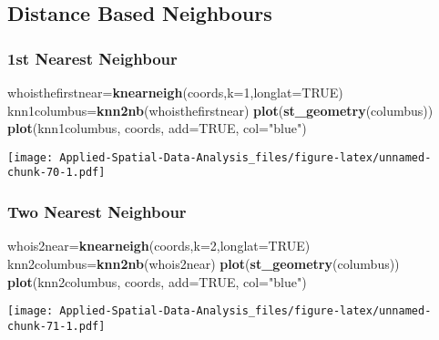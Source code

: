 \documentclass[
]{book}
\newenvironment{Shaded}{\begin{snugshade}}{\end{snugshade}}
\newcommand{\DataTypeTok}[1]{\textcolor[rgb]{0.13,0.29,0.53}{#1}}
\newcommand{\DecValTok}[1]{\textcolor[rgb]{0.00,0.00,0.81}{#1}}
\newcommand{\KeywordTok}[1]{\textcolor[rgb]{0.13,0.29,0.53}{\textbf{#1}}}
\newcommand{\NormalTok}[1]{#1}
\newcommand{\OtherTok}[1]{\textcolor[rgb]{0.56,0.35,0.01}{#1}}
\newcommand{\StringTok}[1]{\textcolor[rgb]{0.31,0.60,0.02}{#1}}
\begin{document}
\hypertarget{distance-based-neighbours}{%
\subsection{Distance Based Neighbours}\label{distance-based-neighbours}}

\hypertarget{st-nearest-neighbour}{%
\subsubsection{1st Nearest Neighbour}\label{st-nearest-neighbour}}

\begin{Shaded}
\begin{Highlighting}[]
\NormalTok{whoisthefirstnear=}\KeywordTok{knearneigh}\NormalTok{(coords,}\DataTypeTok{k=}\DecValTok{1}\NormalTok{,}\DataTypeTok{longlat=}\OtherTok{TRUE}\NormalTok{)}
\NormalTok{knn1columbus=}\KeywordTok{knn2nb}\NormalTok{(whoisthefirstnear)}
\KeywordTok{plot}\NormalTok{(}\KeywordTok{st_geometry}\NormalTok{(columbus))}
\KeywordTok{plot}\NormalTok{(knn1columbus, coords, }\DataTypeTok{add=}\OtherTok{TRUE}\NormalTok{, }\DataTypeTok{col=}\StringTok{"blue"}\NormalTok{)}
\end{Highlighting}
\end{Shaded}

\texttt{[image: Applied-Spatial-Data-Analysis\_files/figure-latex/unnamed-chunk-70-1.pdf]}

\hypertarget{two-nearest-neighbour}{%
\subsubsection{Two Nearest Neighbour}\label{two-nearest-neighbour}}

\begin{Shaded}
\begin{Highlighting}[]
\NormalTok{whois2near=}\KeywordTok{knearneigh}\NormalTok{(coords,}\DataTypeTok{k=}\DecValTok{2}\NormalTok{,}\DataTypeTok{longlat=}\OtherTok{TRUE}\NormalTok{)}
\NormalTok{knn2columbus=}\KeywordTok{knn2nb}\NormalTok{(whois2near)}
\KeywordTok{plot}\NormalTok{(}\KeywordTok{st_geometry}\NormalTok{(columbus))}
\KeywordTok{plot}\NormalTok{(knn2columbus, coords, }\DataTypeTok{add=}\OtherTok{TRUE}\NormalTok{, }\DataTypeTok{col=}\StringTok{"blue"}\NormalTok{)}
\end{Highlighting}
\end{Shaded}

\texttt{[image: Applied-Spatial-Data-Analysis\_files/figure-latex/unnamed-chunk-71-1.pdf]}
\end{document}
